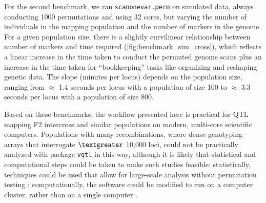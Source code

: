 \documentclass[9pt,twocolumn,twoside]{gsag3jnl}
\begin{document}
For the second benchmark, we ran \texttt{scanonevar.perm} on simulated data, always conducting 1000 permutations and using 32 cores, but varying the number of individuals in the mapping population and the number of markers in the genome.
For a given population size, there is a slightly curvilinear relationship between number of markers and time required (\autoref{fig:benchmark_sim_cross}), which reflects a linear increase in the time taken to conduct the permuted genome scans plus an increase in the time taken for ``bookkeeping'' tasks like organizing and reshaping genetic data.
The slope (minutes per locus) depends on the population size, ranging from $\approx$ 1.4 seconds per locus with a population of size 100 to $\approx$ 3.3 seconds per locus with a population of size 800.

Based on these benchmarks, the workflow presented here is practical for QTL mapping F2 intercross and similar populations on modern, multi-core scientific computers.
Populations with many recombinations, where dense genotyping arrays that interrogate $\textgreater$ 10,000 loci, could not be practically analyzed with package \texttt{vqtl} in this way, although it is likely that statistical and computational steps could be taken to make such studies feasible:
statistically, techniques could be used that allow for large-scale analysis without permutation testing \citep{Efron2004};
computationally, the software could be modified to run on a computer cluster, rather than on a single computer \citep{Jette2003a,Marchand2017}.

\end{document}
